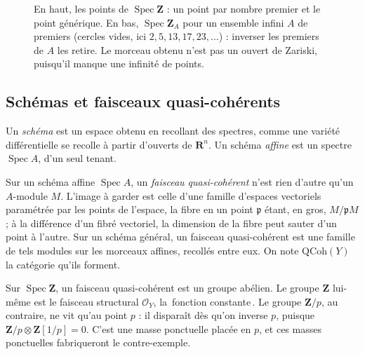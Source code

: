 \documentclass[11pt,a4paper]{amsart}
\theoremstyle{definition}
\theoremstyle{plain}
\theoremstyle{remark}
\newcommand{\Z}{\mathbf Z}
\newcommand{\QCoh}{\mathrm{QCoh}}
\newcommand{\Spec}{\operatorname{Spec}}
\begin{document}
\begin{figure}[htbp]
\centering
{}
\caption{En haut, les points de $\Spec\Z$ : un point par nombre premier et le point générique. En bas, $\Spec\Z_A$ pour un ensemble infini $A$ de premiers (cercles vides, ici $2,5,13,17,23,\dots$) : inverser les premiers de $A$ les retire. Le morceau obtenu n'est pas un ouvert de Zariski, puisqu'il manque une infinité de points.}\label{fig:specZ}
\end{figure}

\subsection{Schémas et faisceaux quasi-cohérents}

Un \emph{schéma} est un espace obtenu en recollant des spectres, comme une variété différentielle se recolle à partir d'ouverts de $\mathbf R^n$. Un schéma \emph{affine} est un spectre $\Spec A$, d'un seul tenant.

Sur un schéma affine $\Spec A$, un \emph{faisceau quasi-cohérent} n'est rien d'autre qu'un $A$-module $M$. L'image à garder est celle d'une famille d'espaces vectoriels paramétrée par les points de l'espace, la fibre en un point $\mathfrak p$ étant, en gros, $M/\mathfrak pM$ ; à la différence d'un fibré vectoriel, la dimension de la fibre peut sauter d'un point à l'autre. Sur un schéma général, un faisceau quasi-cohérent est une famille de tels modules sur les morceaux affines, recollés entre eux. On note $\QCoh(Y)$ la catégorie qu'ils forment.

Sur $\Spec\Z$, un faisceau quasi-cohérent est un groupe abélien. Le groupe $\Z$ lui-même est le faisceau structural $\mathcal O_Y$, la \guillemotleft\,fonction constante\,\guillemotright{}. Le groupe $\Z/p$, au contraire, ne vit qu'au point $p$ : il disparaît dès qu'on inverse $p$, puisque $\Z/p\otimes\Z[1/p]=0$. C'est une masse ponctuelle placée en $p$, et ces masses ponctuelles fabriqueront le contre-exemple.
\end{document}
